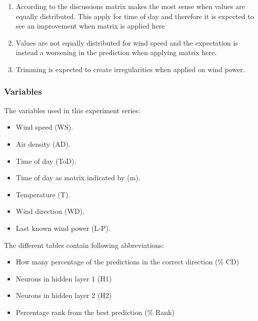 \begin{enumerate}
\item According to the discussions matrix makes the most sense when values are equally distributed. This apply for time of day and therefore it is expected to see an improvement when matrix is applied here
\item Values are not equally distributed for wind speed and the expectation is instead a worsening in the prediction when applying matrix here.
\item Trimming is expected to create irregularities when applied on wind power.
\end{enumerate}

\subsubsection{Variables}
The variables used in this experiment series:

\begin{itemize}
\item Wind speed (WS).
\item Air density (AD).
\item Time of day (ToD).
\item Time of day as matrix indicated by (m).
\item Temperature (T).
\item Wind direction (WD).
\item Last known wind power (L-P).
\end{itemize}

The different tables contain following abbreviations:

\begin{itemize}
\item How many percentage of the predictions in the correct direction (\% CD)
\item Neurons in hidden layer 1 (H1)
\item Neurons in hidden layer 2 (H2)
\item Percentage rank from the best prediction (\% Rank)
\end{itemize}

